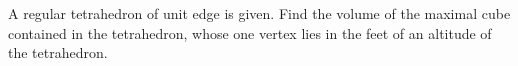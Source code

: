 A regular tetrahedron of unit edge is given. Find the volume of the maximal cube contained in the tetrahedron, whose one vertex lies in the feet of an altitude of the tetrahedron.